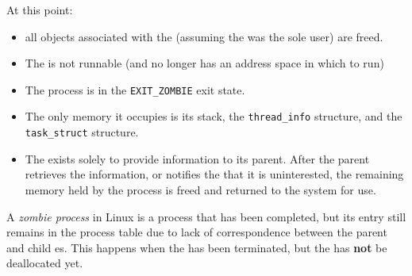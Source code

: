 At this point:
\begin{itemize}[noitemsep]
\item all objects associated with the  (assuming the  was the
  sole user) are freed.
\item The  is not runnable (and no longer has an address space in which to run)
\item The process is in the \texttt{EXIT_ZOMBIE} exit state.
\item The only memory it occupies is its  stack, the \texttt{thread_info} structure, and the \texttt{task_struct} structure.
\item The  exists solely to provide information to its parent.
  After the parent retrieves the information, or notifies the  that it is uninterested, the remaining memory held by the process is freed and returned to the system for use.
\end{itemize}

\begin{definition}\label{def:Zombie_Process}
  A \emph{zombie process} in Linux is a process that has been completed, but its entry still remains in the process table due to lack of correspondence between the parent and child es.
  This happens when the  has been terminated, but the  has \textbf{not} be deallocated yet.
\end{definition}


